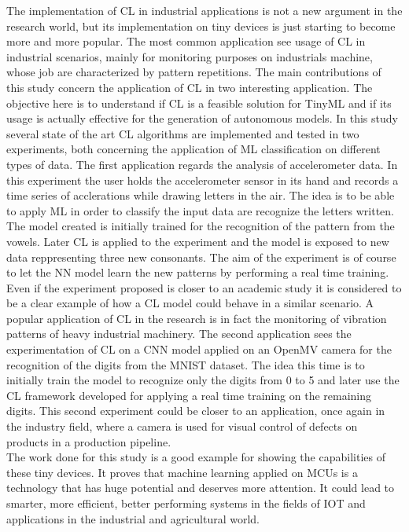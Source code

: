 \documentclass[12pt]{report}
\begin{document}
The implementation of CL in industrial applications is not a new argument in the research world, but its implementation on tiny devices is just starting to become more and more popular. The most common application see usage of CL in industrial scenarios, mainly for monitoring purposes on industrials machine, whose job are characterized by pattern repetitions. The main contributions of this study concern the application of CL in two interesting application. The objective here is to understand if CL is a feasible solution for TinyML and if its usage is actually effective for the generation of autonomous models. In this study several state of the art CL algorithms are implemented and tested in two experiments, both concerning the application of ML classification on different types of data. The first application regards the analysis of accelerometer data. In this experiment the user holds the accelerometer sensor in its hand and records a time series of acclerations while drawing letters in the air. The idea is to be able to apply ML in order to classify the input data are recognize the letters written. The model created is initially trained for the recognition of the pattern from the vowels. Later CL is applied to the experiment and the model is exposed to new data reppresenting three new consonants. The aim of the experiment is of course to let the NN model learn the new patterns by performing a real time training. Even if the experiment proposed is closer to an academic study it is considered to be a clear example of how a CL model could behave in a similar scenario. A popular application of CL in the research is in fact the monitoring of vibration patterns of heavy industrial machinery. The second application sees the experimentation of CL on a CNN model applied on an OpenMV camera for the recognition of the digits from the MNIST dataset. The idea this time is to initially train the model to recognize only the digits from 0 to 5 and later use the CL framework developed for applying a real time training on the remaining digits. This second experiment could be closer to an application, once again in the industry field, where a camera is used for visual control of defects on products in a production pipeline.  \\
The work done for this study is a good example for showing the capabilities of these tiny devices. It proves that machine learning applied on MCUs is a technology that has huge potential and deserves more attention. It could lead to smarter, more efficient, better performing systems in the fields of IOT and applications in the industrial and agricultural world. 
\end{document}
